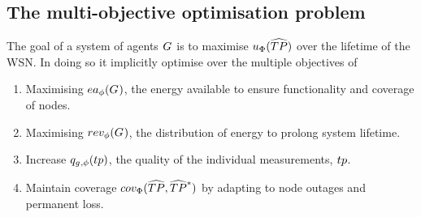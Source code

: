 \subsection{The multi-objective optimisation problem}

The goal of a system of agents $G_{}^{}$ is to maximise $\functionSystemUtility{}{}$ over the lifetime of the WSN. In doing so it implicitly optimise over the multiple objectives of
\begin{enumerate}
	\item Maximising $\functionEnergyAvailable{}{}$, the energy available to ensure functionality and coverage of nodes.
	\item Maximising $\functionEnergyVariability{}{}$,  the distribution of energy to prolong system lifetime.
	\item Increase $\functionAtomicTaskQualitySignature{}{}$, the quality of the individual measurements, $\varAtomicTask{}{}$.
	\item Maintain coverage $\functionSystemCoverage{}{}$ by adapting to node outages and permanent loss.
\end{enumerate}